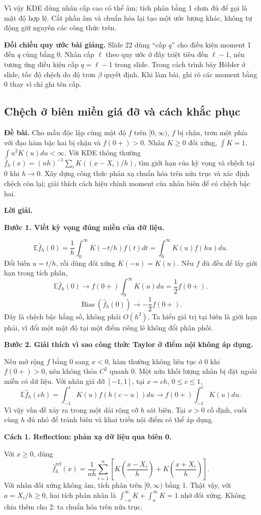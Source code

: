 \documentclass[11pt,a4paper]{article}
\newcommand{\E}{\mathbb E}
\newcommand{\fh}{\widehat f_h}
\DeclareMathOperator{\Bias}{Bias}
\newcommand{\buoc}[1]{\par\medskip\textbf{#1}\par}
\begin{document}
Vì vậy KDE dùng nhân cấp cao có thể âm; tích phân bằng 1 chưa đủ để gọi là mật độ hợp lệ. Cắt phần âm và chuẩn hóa lại tạo một ước lượng khác, không tự động giữ nguyên các công thức trên.

\textbf{Đối chiếu quy ước bài giảng.} Slide 22 dùng ``cấp $q$'' cho điều kiện moment 1 đến $q$ cùng bằng 0. Nhân cấp $\ell$ theo quy ước ở đây triệt tiêu đến $\ell-1$, nên tương ứng điều kiện cấp $q=\ell-1$ trong slide. Trong cách trình bày Hölder ở slide, tốc độ chệch do độ trơn $\beta$ quyết định. Khi làm bài, ghi rõ các moment bằng 0 thay vì chỉ ghi tên cấp.

\subsection{Chệch ở biên miền giá đỡ và cách khắc phục}\label{sec:boundary}
\textbf{Đề bài.} Cho mẫu độc lập cùng mật độ $f$ trên $[0,\infty)$,
$f$ bị chặn, trơn một phía với đạo hàm bậc hai bị chặn và $f(0+)>0$.
Nhân $K\geq0$ đối xứng, $\int K=1$, $\int u^2K(u)du<\infty$.
Với KDE thông thường $\widehat f_h(x)=(nh)^{-1}\sum_iK((x-X_i)/h)$,
tìm giới hạn của kỳ vọng và chệch tại 0 khi $h\to0$.
Xây dựng công thức phản xạ chuẩn hóa trên nửa trục và xác định chệch còn lại;
giải thích cách hiệu chỉnh moment của nhân biên để có chệch bậc hai.

\textbf{Lời giải.}

\buoc{Bước 1. Viết kỳ vọng đúng miền của dữ liệu.}
\[
\E\fh(0)=\frac1h\int_0^\infty K(-t/h)f(t)dt
=\int_0^\infty K(u)f(hu)du.
\]
Đổi biến $u=t/h$, rồi dùng đối xứng $K(-u)=K(u)$. Nếu $f$ đủ đều để lấy giới hạn trong tích phân,
\[
\E\fh(0)\longrightarrow f(0+)\int_0^\infty K(u)du=\frac12f(0+).
\]
\[
\boxed{\Bias(\fh(0))\longrightarrow-\frac12f(0+).}
\]
Đây là chệch bậc hằng số, không phải $O(h^2)$. Ta hiểu giá trị tại biên là giới hạn phải, vì đổi một mật độ tại một điểm riêng lẻ không đổi phân phối.

\buoc{Bước 2. Giải thích vì sao công thức Taylor ở điểm nội không áp dụng.}
Nếu mở rộng $f$ bằng 0 sang $x<0$, hàm thường không liên tục ở 0 khi $f(0+)>0$, nên không thỏa $C^2$ quanh 0. Một nửa khối lượng nhân bị đặt ngoài miền có dữ liệu.
Với nhân giá đỡ $[-1,1]$, tại $x=ch$, $0\leq c\leq1$,
\[
\E\fh(ch)=\int_{-1}^{c}K(u)f(h(c-u))du
\longrightarrow f(0+)\int_{-1}^{c}K(u)du.
\]
Vì vậy vấn đề xảy ra trong một dải rộng cỡ $h$ sát biên. Tại $x>0$ cố định, cuối cùng $h$ đủ nhỏ để tránh biên và khai triển nội điểm có thể áp dụng.

\buoc{Cách 1. Reflection: phản xạ dữ liệu qua biên 0.}
Với $x\geq0$, dùng
\[
\boxed{\widehat f_h^{\mathrm{ref}}(x)=\frac1{nh}\sum_{i=1}^n
\left[K\!\left(\frac{x-X_i}{h}\right)+K\!\left(\frac{x+X_i}{h}\right)\right].}
\]
Với nhân đối xứng không âm, tích phân trên $[0,\infty)$ bằng 1. Thật vậy, với $a=X_i/h\geq0$, hai tích phân nhân là $\int_{-a}^\infty K+\int_a^\infty K=1$ nhờ đối xứng. Không chia thêm cho 2: ta chuẩn hóa trên nửa trục.
\end{document}
